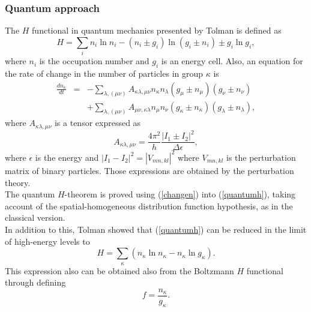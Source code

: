 \documentclass{article}
\begin{document}
\subsubsection{Quantum approach}
The $H$ functional in quantum mechanics presented by Tolman \cite{tolman} is defined as 
\begin{equation}
    H=\sum_i n_i \ln n_i -(n_i\pm g_i)\ln (g_i \pm n_i)\pm g_i\ln g_i, \label{quantumh}
\end{equation}
where $n_i$ is the occupation number and $g_i$ is an energy cell. Also, an equation for the rate of change in the number of particles in group $\kappa$ is
\begin{eqnarray}
    \frac{d n_{\kappa}}{dt}&=&-\sum_{\lambda,(\mu \nu)}A_{\kappa\lambda,\mu\nu} n_{\kappa}n_{\lambda}(g_{\mu}\pm n_{\mu})(g_{\nu}\pm n_{\nu})\nonumber \\
    &&+\sum_{\lambda,(\mu \nu)}A_{\mu\nu,\kappa\lambda} n_{\mu}n_{\nu}(g_{\kappa}\pm n_{\kappa})(g_{\lambda}\pm n_{\lambda}),\label{changen}
\end{eqnarray}
where $A_{\kappa\lambda,\mu\nu}$ is a tensor expressed as
\begin{equation}
  A_{\kappa\lambda,\mu\nu}=\frac{4\pi^{2}}{h}\frac{|I_1\pm I_2|^2}{\Delta \epsilon},
\end{equation}
where $\epsilon$ is the energy and $|I_1-I_2|^2=|V_{mn,kl}|^2$ where $V_{mn,kl}$ is the perturbation matrix of binary particles. Those expressions are obtained by the perturbation theory.\\
The quantum $H$-theorem is proved using (\ref{changen}) into (\ref{quantumh}), taking account of the spatial-homogeneous distribution function hypothesis, as in the classical version.\\
In addition to this, Tolman showed that (\ref{quantumh}) can be reduced in the limit of high-energy levels to
\begin{equation}
    H = \sum_{\kappa} (n_{\kappa} \ln n_{\kappa} - n_{\kappa} \ln g_{\kappa}). \label{reduce-h}
\end{equation}
This expression also can be obtained also from the Boltzmann $H$ functional through defining 
\begin{equation}
    f=\frac{n_{\kappa}}{ g_{\kappa}}.
\end{equation}
\end{document}
